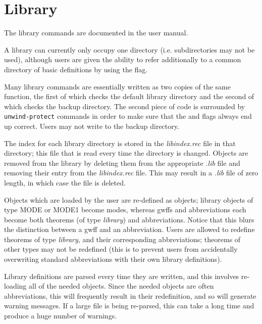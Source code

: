 \chapter{Library}


The library commands are documented in the user manual.

A library can currently only occupy one directory (i.e. subdirectories
may not be used), although users are given the ability to refer additionally to a
common directory of basic definitions by using the  flag.

Many library commands are essentially written as two copies of the same function, 
the first of which checks the default library directory and the second of which
checks the backup directory. The second piece of code is surrounded by {\tt unwind-protect}
commands in order to make sure that the  and 
flags always end up correct. Users may not write to the backup directory.

The index for each library directory is stored in the {\it libindex.rec} file in that directory;
this file that is read every time the directory is changed. Objects are removed from the library 
by deleting them from the appropriate {\it .lib} file and removing their entry from the {\it libindex.rec}
file. This may result in a {\it .lib} file of zero length, in which case the file is deleted.

Objects which are loaded by the user are re-defined as \TPS objects; library objects of type 
MODE or MODE1 become \TPS modes, whereas gwffs and abbreviations each become both theorems
(of type {\it library}) and abbreviations. Notice that this blurs the distinction between a gwff and an 
abbreviation. Users are allowed to redefine \TPS theorems of type {\it library}, and their corresponding
abbreviations; theorems of other types may not be redefined (this is to prevent users from accidentally
overwriting standard abbreviations with their own library definitions).

Library definitions are parsed every time they are written, and this involves re-loading all of the
needed objects. Since the needed objects are often abbreviations, this will frequently result in 
their redefinition, and so \lisp will generate warning messages. If a large file is being re-parsed,
this can take a long time and produce a huge number of warnings.

